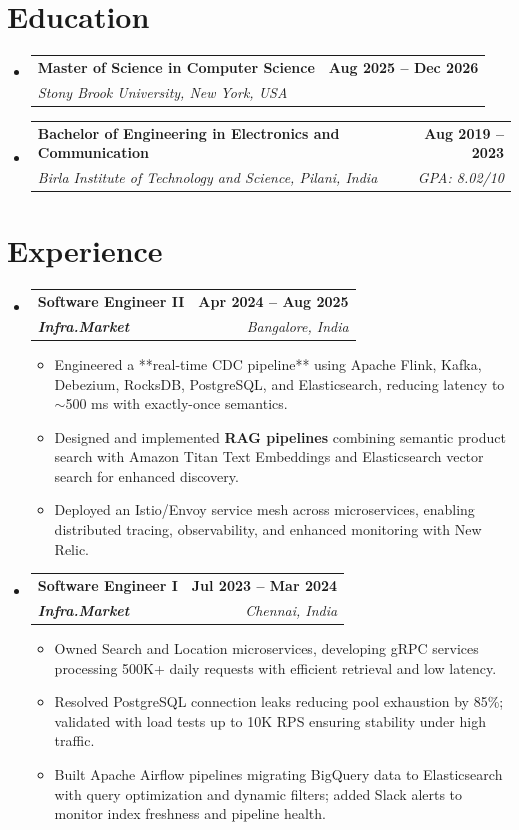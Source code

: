\documentclass[letterpaper,11pt]{article}
\makeatletter
\newcommand{\resumeItem}[1]{
  \item\small{
    {#1 \vspace{-2pt}}
  }
}
\newcommand{\resumeSubheading}[4]{
  \vspace{-2pt}\item
    \begin{tabular*}{1.0\textwidth}[t]{l@{\extracolsep{\fill}}r}
      \textbf{#1} & \textbf{\small #2} \\
      \textit{\small#3} & \textit{\small #4} \\
    \end{tabular*}\vspace{-7pt}
}
\newcommand{\resumeSubHeadingListStart}{\begin{itemize}[leftmargin=0.0in, label={}]}
\newcommand{\resumeSubHeadingListEnd}{\end{itemize}}
\newcommand{\resumeItemListStart}{\begin{itemize}}
\newcommand{\resumeItemListEnd}{\end{itemize}\vspace{-5pt}}
\makeatother
\begin{document}
\section{Education}
  \resumeSubHeadingListStart
    \resumeSubheading
      {Master of Science in Computer Science}{Aug 2025 -- Dec 2026}
      {Stony Brook University, New York, USA}{}
    \resumeSubheading
      {Bachelor of Engineering in Electronics and Communication}{Aug 2019 -- 2023}
      {Birla Institute of Technology and Science, Pilani, India}{GPA: 8.02/10}
  \resumeSubHeadingListEnd
\vspace{-12pt}

\section{Experience}
  \resumeSubHeadingListStart

    \resumeSubheading
      {\textbf{Software Engineer II}}{\textbf{Apr 2024 -- Aug 2025}}
      {\textbf{Infra.Market}}{Bangalore, India}
      \resumeItemListStart
        \resumeItem{Engineered a **real-time CDC pipeline** using Apache Flink, Kafka, Debezium, RocksDB, PostgreSQL, and Elasticsearch, reducing latency to $\sim$500 ms with exactly-once semantics.}
        \resumeItem{Designed and implemented \textbf{RAG pipelines} combining semantic product search with Amazon Titan Text Embeddings and Elasticsearch vector search for enhanced discovery.}
        \resumeItem{Deployed an Istio/Envoy service mesh across microservices, enabling distributed tracing, observability, and enhanced monitoring with New Relic.}
      \resumeItemListEnd

    \resumeSubheading
      {\textbf{Software Engineer I}}{\textbf{Jul 2023 -- Mar 2024}}
      {\textbf{Infra.Market}}{Chennai, India}
      \resumeItemListStart
        \resumeItem{Owned Search and Location microservices, developing gRPC services processing 500K+ daily requests with efficient retrieval and low latency.}
        \resumeItem{Resolved PostgreSQL connection leaks reducing pool exhaustion by 85\%; validated with load tests up to 10K RPS ensuring stability under high traffic.}
        \resumeItem{Built Apache Airflow pipelines migrating BigQuery data to Elasticsearch with query optimization and dynamic filters; added Slack alerts to monitor index freshness and pipeline health.}
      \resumeItemListEnd

  \resumeSubHeadingListEnd
\vspace{-12pt}
\end{document}
